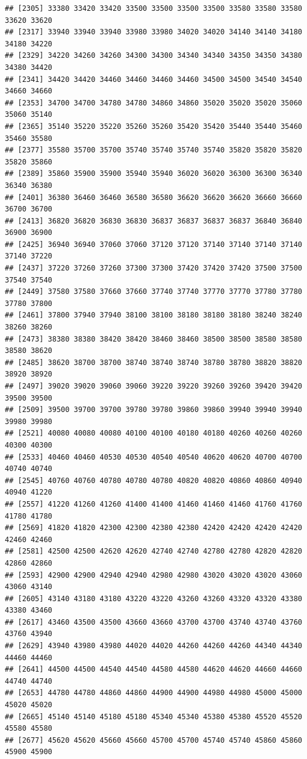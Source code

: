 \documentclass[
  12pt,
]{article}
\begin{document}
\begin{verbatim}
## [2305] 33380 33420 33420 33500 33500 33500 33500 33580 33580 33580 33620 33620
## [2317] 33940 33940 33940 33980 33980 34020 34020 34140 34140 34180 34180 34220
## [2329] 34220 34260 34260 34300 34300 34340 34340 34350 34350 34380 34380 34420
## [2341] 34420 34420 34460 34460 34460 34460 34500 34500 34540 34540 34660 34660
## [2353] 34700 34700 34780 34780 34860 34860 35020 35020 35020 35060 35060 35140
## [2365] 35140 35220 35220 35260 35260 35420 35420 35440 35440 35460 35460 35580
## [2377] 35580 35700 35700 35740 35740 35740 35740 35820 35820 35820 35820 35860
## [2389] 35860 35900 35900 35940 35940 36020 36020 36300 36300 36340 36340 36380
## [2401] 36380 36460 36460 36580 36580 36620 36620 36620 36660 36660 36700 36700
## [2413] 36820 36820 36830 36830 36837 36837 36837 36837 36840 36840 36900 36900
## [2425] 36940 36940 37060 37060 37120 37120 37140 37140 37140 37140 37140 37220
## [2437] 37220 37260 37260 37300 37300 37420 37420 37420 37500 37500 37540 37540
## [2449] 37580 37580 37660 37660 37740 37740 37770 37770 37780 37780 37780 37800
## [2461] 37800 37940 37940 38100 38100 38180 38180 38180 38240 38240 38260 38260
## [2473] 38380 38380 38420 38420 38460 38460 38500 38500 38580 38580 38580 38620
## [2485] 38620 38700 38700 38740 38740 38740 38780 38780 38820 38820 38920 38920
## [2497] 39020 39020 39060 39060 39220 39220 39260 39260 39420 39420 39500 39500
## [2509] 39500 39700 39700 39780 39780 39860 39860 39940 39940 39940 39980 39980
## [2521] 40080 40080 40080 40100 40100 40180 40180 40260 40260 40260 40300 40300
## [2533] 40460 40460 40530 40530 40540 40540 40620 40620 40700 40700 40740 40740
## [2545] 40760 40760 40780 40780 40780 40820 40820 40860 40860 40940 40940 41220
## [2557] 41220 41260 41260 41400 41400 41460 41460 41460 41760 41760 41780 41780
## [2569] 41820 41820 42300 42300 42380 42380 42420 42420 42420 42420 42460 42460
## [2581] 42500 42500 42620 42620 42740 42740 42780 42780 42820 42820 42860 42860
## [2593] 42900 42900 42940 42940 42980 42980 43020 43020 43020 43060 43060 43140
## [2605] 43140 43180 43180 43220 43220 43260 43260 43320 43320 43380 43380 43460
## [2617] 43460 43500 43500 43660 43660 43700 43700 43740 43740 43760 43760 43940
## [2629] 43940 43980 43980 44020 44020 44260 44260 44260 44340 44340 44460 44460
## [2641] 44500 44500 44540 44540 44580 44580 44620 44620 44660 44660 44740 44740
## [2653] 44780 44780 44860 44860 44900 44900 44980 44980 45000 45000 45020 45020
## [2665] 45140 45140 45180 45180 45340 45340 45380 45380 45520 45520 45580 45580
## [2677] 45620 45620 45660 45660 45700 45700 45740 45740 45860 45860 45900 45900

\end{verbatim}
\end{document}
